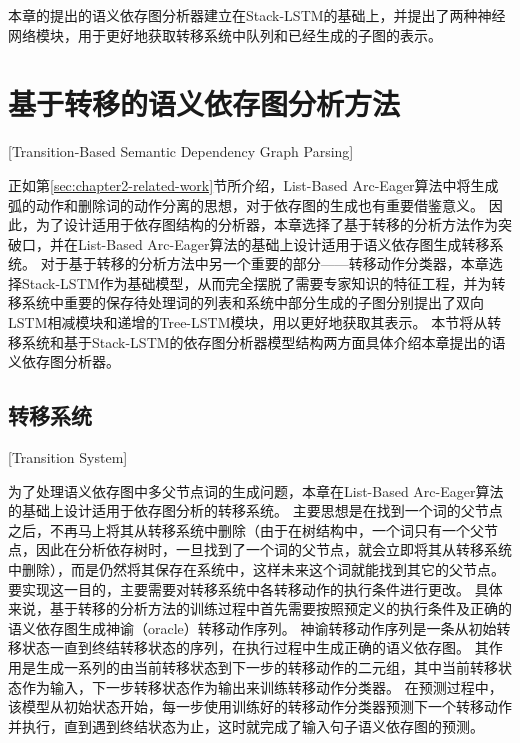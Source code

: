 本章的提出的语义依存图分析器建立在Stack-LSTM的基础上，并提出了两种神经网络模块，用于更好地获取转移系统中队列和已经生成的子图的表示。


\section{基于转移的语义依存图分析方法}[Transition-Based Semantic Dependency Graph Parsing]

正如第\ref{sec:chapter2-related-work}节所介绍，List-Based Arc-Eager算法中将生成弧的动作和删除词的动作分离的思想，对于依存图的生成也有重要借鉴意义。
因此，为了设计适用于依存图结构的分析器，本章选择了基于转移的分析方法作为突破口，并在List-Based Arc-Eager算法的基础上设计适用于语义依存图生成转移系统。
对于基于转移的分析方法中另一个重要的部分——转移动作分类器，本章选择Stack-LSTM作为基础模型，从而完全摆脱了需要专家知识的特征工程，并为转移系统中重要的保存待处理词的列表和系统中部分生成的子图分别提出了双向LSTM相减模块和递增的Tree-LSTM模块，用以更好地获取其表示。
本节将从转移系统和基于Stack-LSTM的依存图分析器模型结构两方面具体介绍本章提出的语义依存图分析器。

\subsection{转移系统}[Transition System]

为了处理语义依存图中多父节点词的生成问题，本章在List-Based Arc-Eager算法的基础上设计适用于依存图分析的转移系统。
主要思想是在找到一个词的父节点之后，不再马上将其从转移系统中删除（由于在树结构中，一个词只有一个父节点，因此在分析依存树时，一旦找到了一个词的父节点，就会立即将其从转移系统中删除），而是仍然将其保存在系统中，这样未来这个词就能找到其它的父节点。
要实现这一目的，主要需要对转移系统中各转移动作的执行条件进行更改。
具体来说，基于转移的分析方法的训练过程中首先需要按照预定义的执行条件及正确的语义依存图生成神谕（oracle）转移动作序列。
神谕转移动作序列是一条从初始转移状态一直到终结转移状态的序列，在执行过程中生成正确的语义依存图。
其作用是生成一系列的由当前转移状态到下一步的转移动作的二元组，其中当前转移状态作为输入，下一步转移状态作为输出来训练转移动作分类器。
在预测过程中，该模型从初始状态开始，每一步使用训练好的转移动作分类器预测下一个转移动作并执行，直到遇到终结状态为止，这时就完成了输入句子语义依存图的预测。

